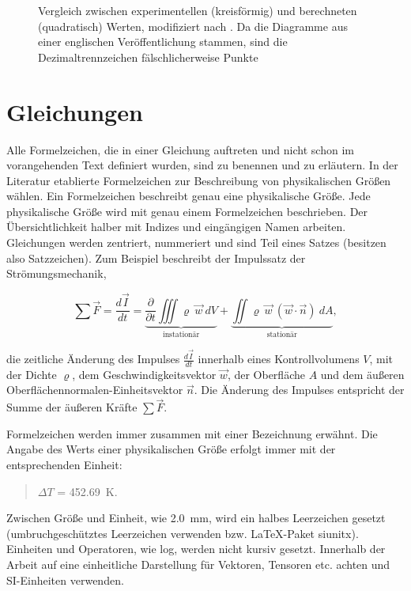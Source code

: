 \begin{figure}[htpb]
	\caption{Vergleich zwischen experimentellen (kreisförmig) und berechneten (quadratisch) Werten, modifiziert nach \cite{wieth2016}. Da die Diagramme aus einer englischen Veröffentlichung stammen, sind die Dezimaltrennzeichen fälschlicherweise Punkte}
	\label{fig:several_graphics}
\end{figure}

\clearpage

\section{Gleichungen}
\label{SECTION:Gleichungen}

Alle Formelzeichen, die in einer Gleichung auftreten und nicht schon im vorangehenden Text definiert wurden, sind zu benennen und zu erläutern. In der Literatur etablierte Formelzeichen zur Beschreibung von physikalischen Größen wählen. Ein Formelzeichen beschreibt genau eine physikalische Größe. Jede physikalische Größe wird mit genau einem Formelzeichen beschrieben. Der Übersichtlichkeit halber mit Indizes und eingängigen Namen arbeiten. Gleichungen werden zentriert, nummeriert und sind Teil eines Satzes (besitzen also Satzzeichen). Zum Beispiel beschreibt der Impulssatz der Strömungsmechanik,

\begin{equation}
\label{EQUATION:Impuls}
\sum\vec{F}=\frac{d\vec{I}}{dt}=\underbrace{\frac{\partial}{\partial t}\iiint\varrho\:\vec{w}\:dV}_{\text{instationär}} + \underbrace{\iint\varrho\:\vec{w}\:\left(\vec{w}\cdot\vec{n}\right)\:dA}_{\text{stationär}},
\end{equation}

die zeitliche Änderung des Impulses $\frac{d\vec{I}}{dt}$ innerhalb eines Kontrollvolumens $V$, mit  der Dichte $\varrho$, dem Geschwindigkeitsvektor $\vec{w}$, der Oberfläche $A$ und dem äußeren Oberflächennormalen-Einheitsvektor $\vec{n}$. Die Änderung des Impulses entspricht der Summe der äußeren Kräfte $\sum\vec{F}$.

Formelzeichen werden immer zusammen mit einer Bezeichnung erwähnt. Die Angabe des Werts einer physikalischen Größe erfolgt immer mit der entsprechenden Einheit:

\begin{quote}
	$\Delta T$ = \SI{452,69}{\kelvin}.
\end{quote}

Zwischen Größe und Einheit, wie \SI{2,0}{\mm}, wird ein halbes Leerzeichen gesetzt (umbruchgeschütztes Leerzeichen verwenden bzw. \LaTeX-Paket siunitx). Einheiten und Operatoren, wie \glqq log\grqq, werden nicht kursiv gesetzt. Innerhalb der Arbeit auf eine einheitliche Darstellung für Vektoren, Tensoren etc. achten und SI-Einheiten verwenden.

